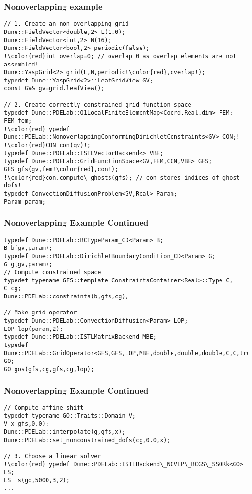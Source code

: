 \begin{frame}[fragile]
  \frametitle{Nonoverlapping example}
  \begin{lstlisting}[breaklines=true,escapechar=!]
// 1. Create an non-overlapping grid
Dune::FieldVector<double,2> L(1.0);
Dune::FieldVector<int,2> N(16);
Dune::FieldVector<bool,2> periodic(false);
!\color{red}int overlap=0; // overlap 0 as overlap elements are not assembled!
Dune::YaspGrid<2> grid(L,N,periodic!\color{red},overlap!);
typedef Dune::YaspGrid<2>::LeafGridView GV;
const GV& gv=grid.leafView();

// 2. Create correctly constrained grid function space
typedef Dune::PDELab::Q1LocalFiniteElementMap<Coord,Real,dim> FEM;
FEM fem;
!\color{red}typedef Dune::PDELab::NonoverlappingConformingDirichletConstraints<GV> CON;!
!\color{red}CON con(gv)!;
typedef Dune::PDELab::ISTLVectorBackend<> VBE;
typedef Dune::PDELab::GridFunctionSpace<GV,FEM,CON,VBE> GFS;
GFS gfs(gv,fem!\color{red},con!);
!\color{red}con.compute\_ghosts(gfs); // con stores indices of ghost dofs!
typedef ConvectionDiffusionProblem<GV,Real> Param;
Param param;
\end{lstlisting}
\end{frame}
\begin{frame}[fragile]
\frametitle<presentation>{Nonoverlapping Example Continued}
  \begin{lstlisting}[breaklines=true]
typedef Dune::PDELab::BCTypeParam_CD<Param> B;
B b(gv,param);
typedef Dune::PDELab::DirichletBoundaryCondition_CD<Param> G;
G g(gv,param);
// Compute constrained space
typedef typename GFS::template ConstraintsContainer<Real>::Type C;
C cg;
Dune::PDELab::constraints(b,gfs,cg);

// Make grid operator
typedef Dune::PDELab::ConvectionDiffusion<Param> LOP;
LOP lop(param,2);
typedef Dune::PDELab::ISTLMatrixBackend MBE;
typedef Dune::PDELab::GridOperator<GFS,GFS,LOP,MBE,double,double,double,C,C,true> GO;
GO gos(gfs,cg,gfs,cg,lop);
\end{lstlisting}
\end{frame}
\begin{frame}[fragile]
\frametitle<presentation>{Nonoverlapping Example Continued}
  \begin{lstlisting}[breaklines=true,escapechar=!]
// Compute affine shift
typedef typename GO::Traits::Domain V;
V x(gfs,0.0);
Dune::PDELab::interpolate(g,gfs,x);
Dune::PDELab::set_nonconstrained_dofs(cg,0.0,x);

// 3. Choose a linear solver
!\color{red}typedef Dune::PDELab::ISTLBackend\_NOVLP\_BCGS\_SSORk<GO> LS;!
LS ls(go,5000,3,2);
...
\end{lstlisting}

\end{frame}



